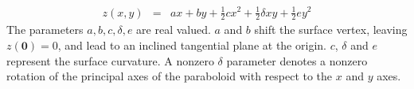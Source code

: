 \documentclass[12pt,a4paper,twoside,openright,BCOR10mm,headsepline,titlepage,abstracton,chapterprefix,final]{scrreprt}
\newcommand\Vector[1]{{\mathbf{#1}}}
\begin{document}
\begin{eqnarray}
 z(x,y) &=& a x + b y + \frac{1}{2} c x^2 + \frac{1}{2} \delta x y + \frac{1}{2} e y^2
\end{eqnarray}
The parameters $a,b,c,\delta,e$ are real valued. 
$a$ and $b$ shift the surface vertex, leaving $z(\Vector{0})=0$, and lead to an inclined tangential plane at the origin.
$c$, $\delta$ and $e$ represent the surface curvature. 
A nonzero $\delta$ parameter denotes a nonzero rotation of the principal axes of the paraboloid with respect to the $x$ and $y$ axes.
%
%
\end{document}
